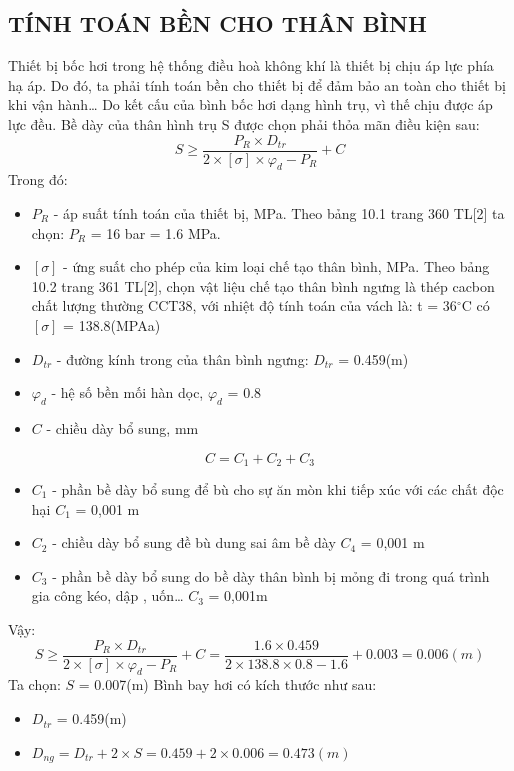 \subsection{TÍNH TOÁN BỀN CHO THÂN BÌNH}
Thiết bị bốc hơi trong hệ thống điều hoà không khí là thiết bị chịu áp lực phía hạ áp. Do đó, ta phải tính toán bền cho thiết bị để đảm bảo an toàn cho thiết bị khi vận hành…
Do kết cấu của bình bốc hơi dạng hình trụ, vì thế chịu được áp lực đều. Bề dày của thân hình trụ S được chọn phải thỏa mãn điều kiện sau:
\begin{equation*}
	S \geq \dfrac{P_{R}\times D_{tr}}{2\times [\sigma]\times\varphi_{d} - P_{R}} + C
\end{equation*}
Trong đó:
\begin{itemize}
	\item $P_{R}$ - áp suất tính toán của thiết bị, MPa. Theo bảng 10.1 trang 360 TL[2] ta chọn: $P_{R}$ = 16 bar = 1.6 MPa.
	\item $[\sigma]$ - ứng suất cho phép của kim loại chế tạo thân bình, MPa. Theo bảng 10.2 trang 361 TL[2], chọn vật liệu chế tạo thân bình ngưng là thép cacbon chất lượng thường CCT38, với nhiệt độ tính toán của vách là: t = 36$^{\circ}$C có $[\sigma]$ = 138.8(MPAa)
	\item $D_{tr}$ - đường kính trong của thân bình ngưng: $D_{tr}$ = 0.459(m)
	\item $\varphi_{d}$ - hệ số bền mối hàn dọc, $\varphi_{d}$ = 0.8
	\item $C$ - chiều dày bổ sung, mm
\end{itemize}
\begin{equation*}
	C = C_{1} + C_{2} + C_{3}
\end{equation*}
\begin{itemize}
	\item $C_{1}$ - phần bề dày bổ sung để bù cho sự ăn mòn khi tiếp xúc với các	chất độc hại $C_{1}$ = 0,001 m
	\item $C_{2}$ - chiều dày bổ sung đề bù dung sai âm bề dày $C_{4}$ = 0,001 m
	\item $C_{3}$ - phần bề dày bổ sung do bề dày thân bình bị mỏng đi trong quá trình gia công kéo, dập , uốn… $C_{3}$ = 0,001m
\end{itemize}
Vậy:
\begin{equation*}
	S \geq \dfrac{P_{R}\times D_{tr}}{2\times [\sigma]\times\varphi_{d} - P_{R}} + C = \dfrac{1.6 \times 0.459}{2 \times 138.8 \times 0.8 - 1.6}+0.003 = 0.006(m)
\end{equation*}
Ta chọn: $S$ = 0.007(m)
Bình bay hơi có kích thước như sau:
\begin{itemize}[label={$\diamond$}]
	\item $D_{tr}$ = 0.459(m)
	\item $D_{ng} = D_{tr} + 2\times S = 0.459 + 2 \times 0.006 = 0.473(m)$
\end{itemize}


